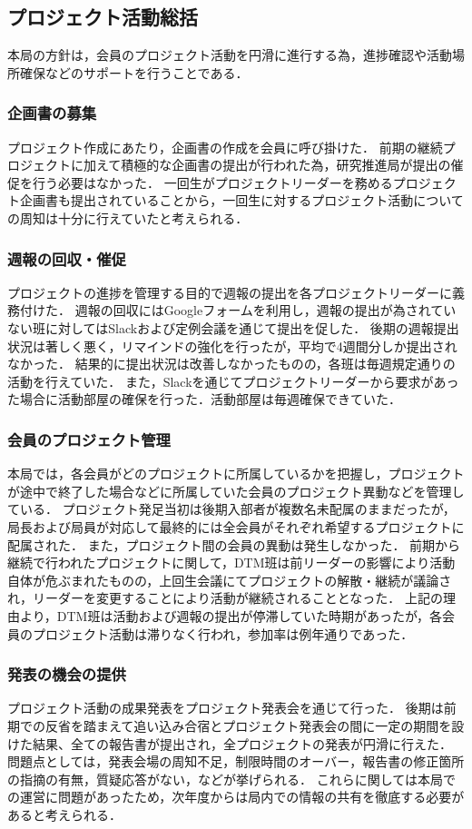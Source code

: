 \subsection*{プロジェクト活動総括}

本局の方針は，会員のプロジェクト活動を円滑に進行する為，進捗確認や活動場所確保などのサポートを行うことである．

\subsubsection*{企画書の募集}
	
プロジェクト作成にあたり，企画書の作成を会員に呼び掛けた．
前期の継続プロジェクトに加えて積極的な企画書の提出が行われた為，研究推進局が提出の催促を行う必要はなかった．
一回生がプロジェクトリーダーを務めるプロジェクト企画書も提出されていることから，一回生に対するプロジェクト活動についての周知は十分に行えていたと考えられる．

\subsubsection*{週報の回収・催促}

プロジェクトの進捗を管理する目的で週報の提出を各プロジェクトリーダーに義務付けた．
週報の回収にはGoogleフォームを利用し，週報の提出が為されていない班に対してはSlackおよび定例会議を通じて提出を促した．
後期の週報提出状況は著しく悪く，リマインドの強化を行ったが，平均で4週間分しか提出されなかった．
結果的に提出状況は改善しなかったものの，各班は毎週規定通りの活動を行えていた．
また，Slackを通じてプロジェクトリーダーから要求があった場合に活動部屋の確保を行った．活動部屋は毎週確保できていた．

\subsubsection*{会員のプロジェクト管理}

本局では，各会員がどのプロジェクトに所属しているかを把握し，プロジェクトが途中で終了した場合などに所属していた会員のプロジェクト異動などを管理している．
プロジェクト発足当初は後期入部者が複数名未配属のままだったが，局長および局員が対応して最終的には全会員がそれぞれ希望するプロジェクトに配属された．
また，プロジェクト間の会員の異動は発生しなかった．
前期から継続で行われたプロジェクトに関して，DTM班は前リーダーの影響により活動自体が危ぶまれたものの，上回生会議にてプロジェクトの解散・継続が議論され，リーダーを変更することにより活動が継続されることとなった．
上記の理由より，DTM班は活動および週報の提出が停滞していた時期があったが，各会員のプロジェクト活動は滞りなく行われ，参加率は例年通りであった．

\subsubsection*{発表の機会の提供}

プロジェクト活動の成果発表をプロジェクト発表会を通じて行った．
後期は前期での反省を踏まえて追い込み合宿とプロジェクト発表会の間に一定の期間を設けた結果、全ての報告書が提出され，全プロジェクトの発表が円滑に行えた．
問題点としては，発表会場の周知不足，制限時間のオーバー，報告書の修正箇所の指摘の有無，質疑応答がない，などが挙げられる．
これらに関しては本局での運営に問題があったため，次年度からは局内での情報の共有を徹底する必要があると考えられる．